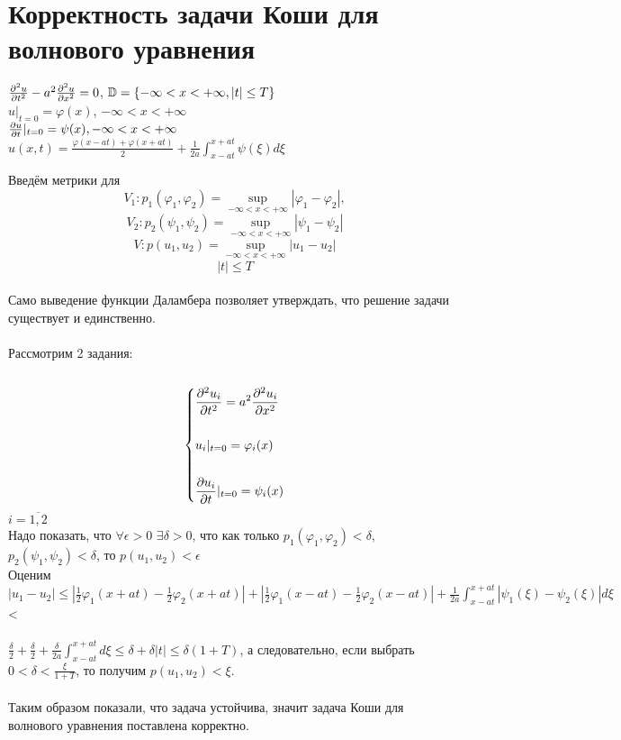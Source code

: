 \documentclass[../main.tex]{subfiles}
\begin{document}
\section{Корректность задачи Коши для волнового уравнения}
\begin{large}
    \begin{center}
        $\frac{\partial^2 u}{\partial t^2}-a^2\frac{\partial^2 u}{\partial x^2}=0$, $\mathbb{D}=\{ -\infty<x<+\infty, |t|\leq T\rbrace$\\
        $ $\\
        $ u|_{t=0} = \varphi(x)$, $-\infty<x<+\infty$\\ 
        $ $\\
        $\frac{\partial u}{\partial t}|_{t=0} = \psi(x),  -\infty<x<+\infty$\\
        $ $\\
        $u(x,t)=\frac{\varphi(x-at)+\varphi(x+at)}{2}+\frac{1}{2a}\int_{x-at}^{x+at}\psi(\xi)d\xi$
    \end{center}
\end{large}
Введём метрики для \[V_1:p_1(\varphi_1,\varphi_2)=\sup_{-\infty<x<+\infty}|\varphi_1-\varphi_2|,\] \[V_2:p_2(\psi_1,\psi_2)=\sup_{-\infty<x<+\infty}|\psi_1-\psi_2|\]\[V:p(u_1,u_2)=\sup_{-\infty<x<+\infty}|u_1-u_2|\]\[ |t| \leq T\]\\
Само выведение функции Даламбера позволяет утверждать, что решение задачи существует и единственно.\\\\
    Рассмотрим 2 задания:\\\\
$$\begin{dcases}
\frac{\partial^2 u_i}{\partial t^2}=a^2\frac{\partial^2 u_i}{\partial x^2}\\\\
     u_i|_{t=0}=\varphi_i(x)\\\\
     \frac{\partial u_i}{\partial t}|_{t=0}=\psi_i(x)
\end{dcases} $$ 
$i=\overline{1,2}$\\ 
Надо показать, что $\forall \epsilon > 0$  $\exists \delta > 0$,  что как только $p_1(\varphi_1, \varphi_2)<\delta$, $p_2(\psi_1, \psi_2)<\delta$, то $p(u_1, u_2)<\epsilon$\\
Оценим\\
$|u_1-u_2| \leq |\frac{1}{2}\varphi_1(x+at)-\frac{1}{2}\varphi_2(x+at)|+|\frac{1}{2}\varphi_1(x-at)-\frac{1}{2}\varphi_2(x-at)|+\frac{1}{2a}\int_{x-at}^{x+at}|\psi_1(\xi)-\psi_2(\xi)|d\xi$<\\\\$\frac{\delta}{2}+\frac{\delta}{2}+\frac{\delta}{2a}\int_{x-at}^{x+at}d\xi \leq \delta+\delta|t| \leq \delta(1+T)$, а следовательно, если выбрать  $0<\delta<\frac{\xi}{1+T}$, то получим $p(u_1, u_2)<\xi$.\\\\
Таким образом показали, что задача устойчива, значит задача Коши для волнового уравнения поставлена корректно.
\end{document}
